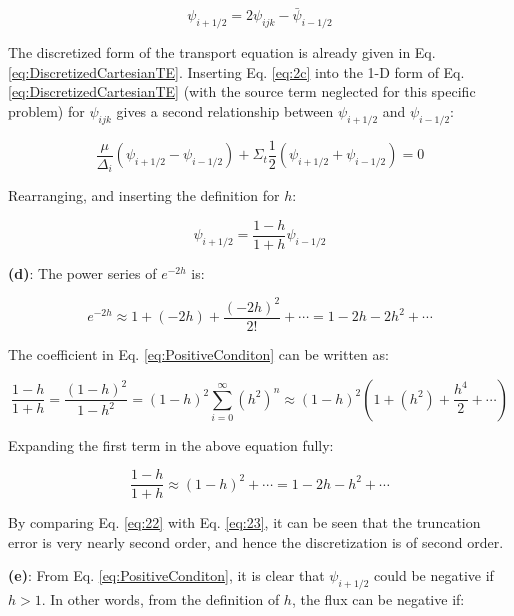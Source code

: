 \documentclass[10pt]{article}
\begin{document}
\begin{equation}
\label{eq:2c}
\psi_{i+1/2}=2\psi_{ijk}-\bar{\psi}_{i-1/2}
\end{equation}

The discretized form of the transport equation is already given in Eq. \eqref{eq:DiscretizedCartesianTE}. Inserting Eq. \eqref{eq:2c} into the 1-D form of Eq. \eqref{eq:DiscretizedCartesianTE} (with the source term neglected for this specific problem) for \(\psi_{ijk}\) gives a second relationship between \(\psi_{i+1/2}\) and \(\psi_{i-1/2}\):

\begin{equation}
\frac{\mu}{\Delta_i}(\psi_{i+1/2}-\psi_{i-1/2})+\Sigma_{t}\frac{1}{2}\left(\psi_{i+1/2}+\psi_{i-1/2}\right)=0
\end{equation}

Rearranging, and inserting the definition for \(h\):

\begin{equation}
\label{eq:PositiveConditon}
\psi_{i+1/2}=\frac{1-h}{1+h}\psi_{i-1/2}
\end{equation}

\textbf{(d)}: The power series of \(e^{-2h}\) is:

\begin{equation}
\label{eq:23}
e^{-2h}\approx1+(-2h)+\frac{(-2h)^2}{2!}+\cdots=1-2h-2h^2+\cdots
\end{equation}

The coefficient in Eq. \eqref{eq:PositiveConditon} can be written as:

\begin{equation}
\frac{1-h}{1+h}=\frac{(1-h)^2}{1-h^2}=(1-h)^2\sum_{i=0}^\infty(h^2)^n\approx(1-h)^2\left(1+(h^2)+\frac{h^4}{2}+\cdots\right)
\end{equation}

Expanding the first term in the above equation fully:

\begin{equation}
\label{eq:22}
\frac{1-h}{1+h}\approx(1-h)^2+\cdots=1-2h-h^2+\cdots
\end{equation}

By comparing Eq. \eqref{eq:22} with Eq. \eqref{eq:23}, it can be seen that the truncation error is very nearly second order, and hence the discretization is of second order. 

\textbf{(e)}: From Eq. \eqref{eq:PositiveConditon}, it is clear that \(\psi_{i+1/2}\) could be negative if \(h>1\). In other words, from the definition of \(h\), the flux can be negative if:
\end{document}
